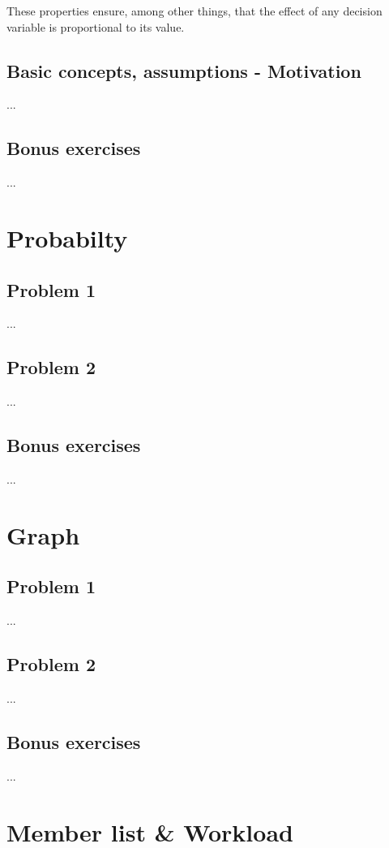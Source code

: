 \documentclass[a4paper]{article}
\begin{document}
These properties ensure, among other things, that the effect of any decision variable is proportional to its value.
	
	\subsection{Basic concepts, assumptions - Motivation}
	...

	\subsection{Bonus exercises}
	...

\section{Probabilty}
	\subsection{Problem 1}
	...
	
	\subsection{Problem 2}
	...

	\subsection{Bonus exercises}
	...



\section{Graph}
	\subsection{Problem 1}
	...
	
	\subsection{Problem 2}
	...

	\subsection{Bonus exercises}
	...

\section{Member list \& Workload}
\end{document}
